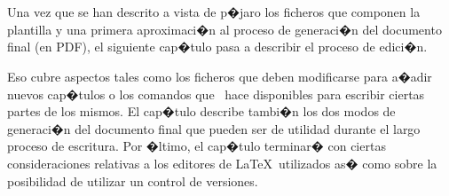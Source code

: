 \section*{\ProximoCapitulo}
\TocProximoCapitulo

Una vez que se han descrito a vista de p�jaro los ficheros que
componen la plantilla y una primera aproximaci�n al proceso de
generaci�n del documento final (en PDF), el siguiente cap�tulo pasa a
describir el proceso de edici�n.

Eso cubre aspectos tales como los ficheros que deben modificarse para
a�adir nuevos cap�tulos o los comandos que \texis\ hace
disponibles para escribir ciertas partes de los mismos. El cap�tulo
describe tambi�n los dos modos de generaci�n del documento final que
pueden ser de utilidad durante el largo proceso de escritura. Por
�ltimo, el cap�tulo terminar� con ciertas consideraciones relativas a
los editores de \LaTeX\ utilizados as� como sobre la posibilidad de
utilizar un control de versiones.

